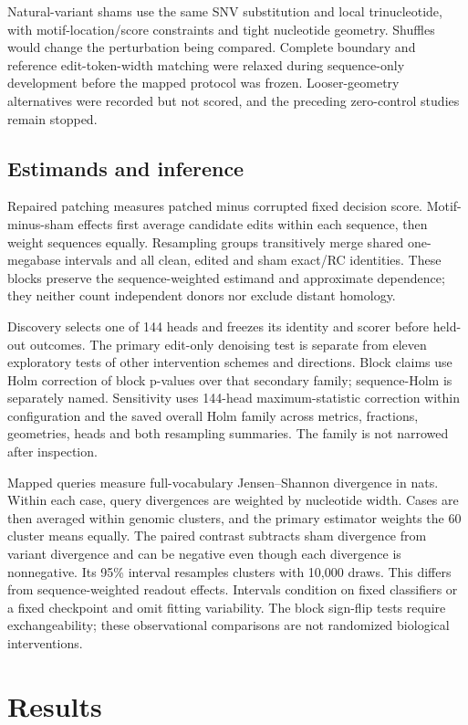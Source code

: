 \documentclass[unnumsec,webpdf,modern,large,namedate]{oup-authoring-template}
\begin{document}
Natural-variant shams use the same SNV substitution and local trinucleotide, with motif-location/score constraints and tight nucleotide geometry. Shuffles would change the perturbation being compared. Complete boundary and reference edit-token-width matching were relaxed during sequence-only development before the mapped protocol was frozen. Looser-geometry alternatives were recorded but not scored, and the preceding zero-control studies remain stopped.
\subsection{Estimands and inference}
Repaired patching measures patched minus corrupted fixed decision score. Motif-minus-sham effects first average candidate edits within each sequence, then weight sequences equally. Resampling groups transitively merge shared one-megabase intervals and all clean, edited and sham exact/RC identities. These blocks preserve the sequence-weighted estimand and approximate dependence; they neither count independent donors nor exclude distant homology.

Discovery selects one of 144 heads and freezes its identity and scorer before held-out outcomes. The primary edit-only denoising test is separate from eleven exploratory tests of other intervention schemes and directions. Block claims use Holm correction of block p-values over that secondary family; sequence-Holm is separately named. Sensitivity uses 144-head maximum-statistic correction within configuration and the saved overall Holm family across metrics, fractions, geometries, heads and both resampling summaries. The family is not narrowed after inspection.

Mapped queries measure full-vocabulary Jensen--Shannon divergence in nats. Within each case, query divergences are weighted by nucleotide width. Cases are then averaged within genomic clusters, and the primary estimator weights the 60 cluster means equally. The paired contrast subtracts sham divergence from variant divergence and can be negative even though each divergence is nonnegative. Its 95\% interval resamples clusters with 10,000 draws. This differs from sequence-weighted readout effects. Intervals condition on fixed classifiers or a fixed checkpoint and omit fitting variability. The block sign-flip tests require exchangeability; these observational comparisons are not randomized biological interventions.
\section{Results}
\end{document}
